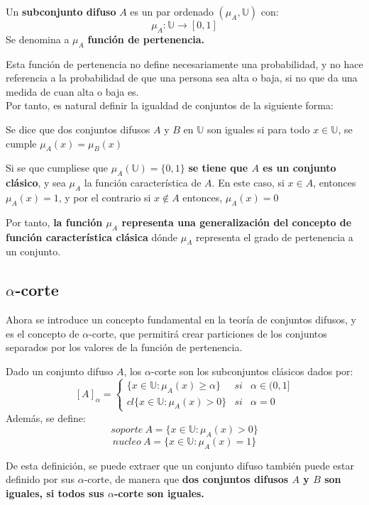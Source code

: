 \begin{definicion}
  \label{def:subconjunto_difuso}
  
  Un \textbf{subconjunto difuso} $A$ es un par ordenado $(\mu_A, \mathbb{U})$ con:
  \[
  \mu_A : \mathbb{U} \longrightarrow [0,1]
  \]
  Se denomina a $\mu_A$ \textbf{función de pertenencia.}
\end{definicion}

Esta función de pertenencia no define necesariamente una probabilidad, y no hace referencia a la probabilidad de que una persona sea alta o baja, si no que da una medida de cuan alta o baja es.\\ 

Por tanto, es natural definir la igualdad de conjuntos de la siguiente forma:

\begin{definicion}
  \label{def:igualdad}
  Se dice que dos conjuntos difusos $A$ y $B$ en $\mathbb{U}$ son iguales si para todo $x \in \mathbb{U}$, se cumple $\mu_A(x) = \mu_B(x)$
\end{definicion}

Si se que cumpliese que $\mu_A(\mathbb{U})=\{0, 1\}$ \textbf{se tiene que $A$ es un conjunto clásico}, y sea $\mu_A$ la función característica de $A$. En este caso, si $x \in A$, entonces $\mu_A(x)=1$, y por el contrario si $x \notin A$ entonces, $\mu_A(x)=0$

Por tanto, \textbf{la función $\mu_A$ representa una generalización del concepto de función característica clásica} dónde $\mu_A$ representa el grado de pertenencia a un conjunto.

\subsection{$\alpha$-corte}
Ahora se introduce un concepto fundamental en la teoría de conjuntos difusos, y es el concepto de $\alpha$-corte, que permitirá crear particiones de los conjuntos separados por los valores de la función de pertenencia.
\begin{definicion}
  \label{def:alpha_corte}
  Dado un conjunto difuso $A$, los $\alpha$-corte son los subconjuntos clásicos dados por:
  \[
    [A]_\alpha = \left\{
    \begin{array}{ccc}
      \{x \in \mathbb{U} : \mu_A(x) \geq \alpha \} & si & \alpha \in (0, 1] \\
	cl\{x \in \mathbb{U} : \mu_A(x) > 0\} & si & \alpha=0
    \end{array}
    \right.
    \]
    Además, se define:
    \[
    soporte ~ A = \{x \in \mathbb{U} : \mu_A(x) > 0 \}
    \]
    \[
    nucleo ~ A = \{x \in \mathbb{U} : \mu_A(x) = 1 \}
    \]
\end{definicion}
De esta definición, se puede extraer que un conjunto difuso también puede estar definido por sus $\alpha$-corte, de manera que \textbf{dos conjuntos difusos $A$ y $B$ son iguales, si todos sus $\alpha$-corte son iguales.} 

